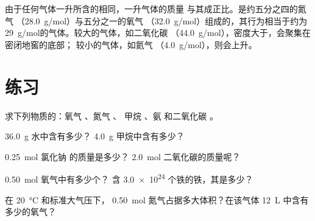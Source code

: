 \begin{remark}[重气体与轻气体]\label{rem:g10:the-mole:heavy}
由于任何气体一升所含的相同，一升气体的质量
与其成正比。是约五分之四的氮气
（\qty{28.0}{g/mol}）与五分之一的氧气
（\qty{32.0}{g/mol}）组成的，其行为相当于约为
\qty{29}{g/mol}的气体。较大的气体，如二氧化碳
（\qty{44.0}{g/mol}），密度大于，会聚集在密闭地窖的底部；
较小的气体，如氦气
（\qty{4.0}{g/mol}），则会上升。
\end{remark}

\section{练习}

\begin{exercise}[$\star$]\label{exo:g10:the-mole:1}
求下列物质的：氧气 、氮气 、
甲烷 、氨  和二氧化碳 。
\end{exercise}

\begin{exercise}[$\star$]\label{exo:g10:the-mole:2}
\qty{36.0}{g} 水中含有多少？
\qty{4.0}{g} 甲烷中含有多少？
\end{exercise}

\begin{exercise}[$\star$]\label{exo:g10:the-mole:3}
\qty{0.25}{mol} 氯化钠  的质量是多少？
\qty{2.0}{mol} 二氧化碳的质量呢？
\end{exercise}

\begin{exercise}[$\star$]\label{exo:g10:the-mole:4}
\qty{0.50}{mol} 氧气中有多少个？
含 \num{3.0e24} 个铁的铁，其是多少？
\end{exercise}

\begin{exercise}[$\star$]\label{exo:g10:the-mole:5}
在 \qty{20}{\celsius} 和标准大气压下，
\qty{0.50}{mol} 氮气占据多大体积？在该气体
\qty{12}{L} 中含有多少的氧气？
\end{exercise}


